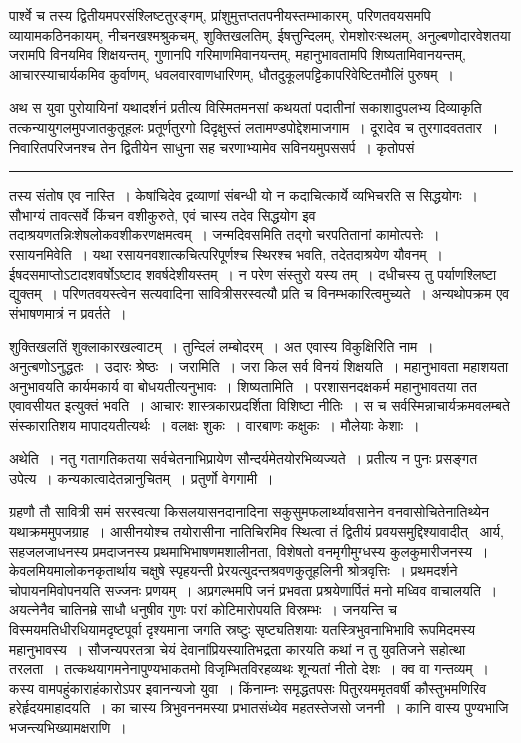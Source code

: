 \documentclass[11pt, openany]{book}
\begin{document}
पार्श्वे च तस्य द्वितीयमपरसंश्लिष्टतुरङ्गम्, प्रांशुमुत्तप्ततपनीयस्तम्भाकारम्, परिणतवयसमपि व्यायामकठिनकायम्, नीचनखश्मश्रुकचम्, शुक्तिखलतिम्, ईषत्तुन्दिलम्, रोमशोरःस्थलम्, अनुल्बणोदारवेशतया जरामपि विनयमिव शिक्षयन्तम्, गुणानपि गरिमाणमिवानयन्तम्, महानुभावतामपि शिष्यतामिवानयन्तम्, आचारस्याचार्यकमिव कुर्वाणम्, धवलवारवाणधारिणम्, धौतदुकूलपट्टिकापरिवेष्टितमौलिं पुरुषम्~।

अथ स युवा पुरोयायिनां यथादर्शनं प्रतीत्य विस्मितमनसां कथयतां पदातीनां सकाशादुपलभ्य दिव्याकृति तत्कन्यायुगलमुपजातकुतूहलः प्रतूर्णतुरगो दिदृक्षुस्तं लतामण्डपोद्देशमाजगाम~। दूरादेव च तुरगादवततार~। निवारितपरिजनश्च तेन द्वितीयेन साधुना सह चरणाभ्यामेव सविनयमुपससर्प~। कृतोपसं\textendash

\vspace{2mm}
\hrule

\noindent
{\s तस्य संतोष एव नास्ति~। केषांचिदेव द्रव्याणां संबन्धी यो न कदाचित्कार्ये व्यभिचरति स सिद्धयोगः~। सौभाग्यं तावत्सर्वे किंचन वशीकुरुते, एवं चास्य तदेव सिद्धयोग इव तदाश्रयणतन्निःशेषलोकवशीकरणक्षमत्वम्~। जन्मदिवसमिति तद्गो चरपतितानां कामोत्पत्तेः~। {\qtt रसायनमिवेति}~। यथा रसायनवशात्कचित्परिपूर्णश्च स्थिरश्च भवति, तदेतदाश्रयेण यौवनम्~। ईषदसमाप्तोऽटादशवर्षोऽष्टाद शवर्षदेशीयस्तम्~। न परेण संस्तुरो यस्य तम्~। दधीचस्य तु पर्याणश्लिष्टा द्युक्तम्~। परिणतवयस्त्वेन सत्यवादिना सावित्रीसरस्वत्यौ प्रति च विनम्भकारित्वमुच्यते~। अन्यथोपक्रम एव संभाषणमात्रं न प्रवर्तते~।

शुक्तिखलतिं शुक्लाकारखल्वाटम्~। तुन्दिलं लम्बोदरम्~। अत एवास्य विकुक्षिरिति नाम~। अनुत्बणोऽनुद्धतः~। उदारः श्रेष्ठः~। {\qtt जरामिति}~। जरा किल सर्व विनयं शिक्षयति~। महानुभावता महाशयता अनुभावयति कार्यमकार्य वा बोधयतीत्यनुभावः~। {\qtt शिष्यतामिति}~। परशासनदक्षकर्म महानुभावतया तत एवावसीयत इत्युक्तं भवति~। आचारः शास्त्रकारप्रदर्शिता विशिष्टा नीतिः~। स च सर्वस्मिन्नाचार्यक्रमवलम्बते संस्कारातिशय मापादयतीत्यर्थः~। वलक्षः शुकः~। वारबाणः कक्षुकः~। मौलेयाः केशाः~।

{\qtt अथेति}~। नतु गतागतिकतया सर्वचेतनाभिप्रायेण सौन्दर्यमेतयोरभिव्यज्यते~। प्रतीत्य न पुनः प्रसङ्गत उपेत्य~। कन्यकात्वादेतन्नानुचितम्~। प्रतुर्णो वेगगामी~।}

\newpage

\noindent
ग्रहणौ तौ सावित्री समं सरस्वत्या किसलयासनदानादिना सकुसुमफलार्थ्यावसानेन वनवासोचितेनातिथ्येन यथाक्रममुपजग्राह~। आसीनयोश्च तयोरासीना नातिचिरमिव स्थित्वा तं द्वितीयं प्रवयसमुद्दिश्यावादीत् \textendash\ आर्य, सहजलजाधनस्य प्रमदाजनस्य प्रथमाभिभाषणमशालीनता, विशेषतो वनमृगीमुग्धस्य कुलकुमारीजनस्य~। केवलमियमालोकनकृतार्थाय चक्षुषे स्पृहयन्ती प्रेरयत्युदन्तश्रवणकुतूहलिनी श्रोत्रवृत्तिः~। प्रथमदर्शने चोपायनमिवोपनयति सज्जनः प्रणयम्~। अप्रगल्भमपि जनं प्रभवता प्रश्रयेणार्पितं मनो मध्विव वाचालयति~। अयत्नेनैव चातिनम्रे साधौ धनुषीव गुणः परां कोटिमारोपयति विस्रम्भः~। जनयन्ति च विस्मयमतिधीरधियामदृष्टपूर्वा दृश्यमाना जगति स्रष्टुः सृष्ट्यतिशयाः यतस्त्रिभुवनाभिभावि रूपमिदमस्य महानुभावस्य~। सौजन्यपरतत्रा चेयं देवानांप्रियस्यातिभद्रता कारयति कथां न तु युवतिजने सहोत्था तरलता~। तत्कथयागमनेनापुण्यभाकतमो विजृम्भितविरहव्यथः शून्यतां नीतो देशः~। क्व वा गन्तव्यम्~। कस्य वामपहुंकाराहंकारोऽपर इवानन्यजो युवा~। किंनाम्नः समृद्धतपसः पितुरयममृतवर्षी कौस्तुभमणिरिव हरेर्हृदयमाहादयति~। का चास्य त्रिभुवननमस्या प्रभातसंध्येव महतस्तेजसो जननी~। कानि वास्य पुण्यभाजि भजन्त्यभिख्यामक्षराणि~।
\end{document}
